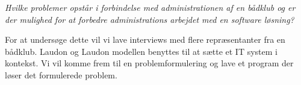 \textit{Hvilke problemer opstår i forbindelse med administrationen af en bådklub og er der mulighed for at forbedre administrations arbejdet med en software løsning?}

For at undersøge dette vil vi lave interviews med flere repræsentanter fra en bådklub. Laudon og Laudon modellen benyttes til at sætte et IT system i kontekst. Vi vil komme frem til en problemformulering og lave et program der løser det formulerede problem.
